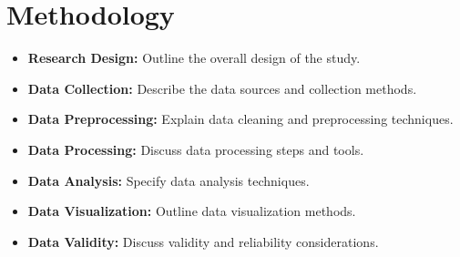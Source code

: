\documentclass[12pt]{article}
\begin{document}
\section{Methodology}
\begin{itemize}
  \item \textbf{Research Design:} Outline the overall design of the study.
  \item \textbf{Data Collection:} Describe the data sources and collection methods.
  \item \textbf{Data Preprocessing:} Explain data cleaning and preprocessing techniques.
  \item \textbf{Data Processing:} Discuss data processing steps and tools.
  \item \textbf{Data Analysis:} Specify data analysis techniques.
  \item \textbf{Data Visualization:} Outline data visualization methods.
  \item \textbf{Data Validity:} Discuss validity and reliability considerations.
\end{itemize}
\end{document}
